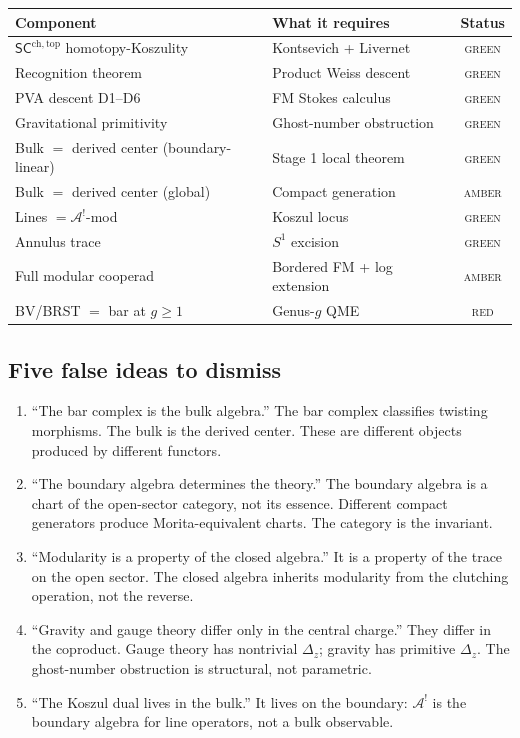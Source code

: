 \documentclass[11pt]{article}
\newcommand{\cA}{\mathcal{A}}
\newcommand{\SCchtop}{\mathsf{SC}^{\mathrm{ch,top}}}
\begin{document}
\begin{center}
\small
\renewcommand{\arraystretch}{1.15}
\begin{tabular}{@{}llc@{}}
\textbf{Component} & \textbf{What it requires} & \textbf{Status} \\
\hline
$\SCchtop$ homotopy-Koszulity & Kontsevich + Livernet &
  \textsc{green} \\[3pt]
Recognition theorem & Product Weiss descent &
  \textsc{green} \\[3pt]
PVA descent D1--D6 & FM Stokes calculus &
  \textsc{green} \\[3pt]
Gravitational primitivity & Ghost-number obstruction &
  \textsc{green} \\[3pt]
Bulk $=$ derived center (boundary-linear) &
  Stage 1 local theorem & \textsc{green} \\[3pt]
Bulk $=$ derived center (global) &
  Compact generation & \textsc{amber} \\[3pt]
Lines $= \cA^!$-mod & Koszul locus &
  \textsc{green} \\[3pt]
Annulus trace & $S^1$ excision &
  \textsc{green} \\[3pt]
Full modular cooperad & Bordered FM + log extension &
  \textsc{amber} \\[3pt]
BV/BRST $=$ bar at $g \geq 1$ & Genus-$g$ QME
  & \textsc{red}
\end{tabular}
\end{center}

\subsection*{Five false ideas to dismiss}

\begin{enumerate}[nosep]
\item ``The bar complex is the bulk algebra.''  The bar complex
  classifies twisting morphisms.  The bulk is the derived center.
  These are different objects produced by different functors.
\item ``The boundary algebra determines the theory.''  The boundary
  algebra is a chart of the open-sector category, not its essence.
  Different compact generators produce Morita-equivalent charts.
  The category is the invariant.
\item ``Modularity is a property of the closed algebra.''  It is a
  property of the trace on the open sector.  The closed algebra
  inherits modularity from the clutching operation, not the reverse.
\item ``Gravity and gauge theory differ only in the central
  charge.''  They differ in the coproduct.  Gauge theory has
  nontrivial $\Delta_z$; gravity has primitive $\Delta_z$.  The
  ghost-number obstruction is structural, not parametric.
\item ``The Koszul dual lives in the bulk.''  It lives on the
  boundary: $\cA^!$ is the boundary algebra for line operators,
  not a bulk observable.
\end{enumerate}
\end{document}

